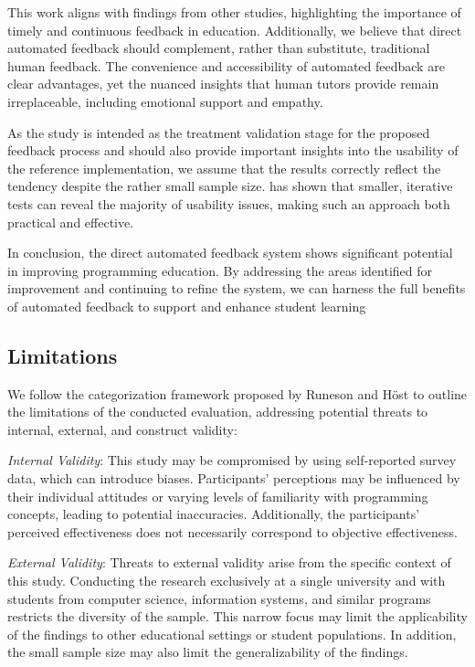 \documentclass[manuscript,screen,review, anonymous]{acmart}
\begin{document}
This work aligns with findings from other studies, highlighting the importance of timely and continuous feedback in education.
Additionally, we believe that direct automated feedback should complement, rather than substitute, traditional human feedback.
The convenience and accessibility of automated feedback are clear advantages, yet the nuanced insights that human tutors provide remain irreplaceable, including emotional support and empathy.

As the study is intended as the treatment validation stage for the proposed feedback process and should also provide important insights into the usability of the reference implementation, we assume that the results correctly reflect the tendency despite the rather small sample size. 
\citet{nielsen:2000:WhyYouOnly} has shown that smaller, iterative tests can reveal the majority of usability issues, making such an approach both practical and effective.

In conclusion, the direct automated feedback system shows significant potential in improving programming education.
By addressing the areas identified for improvement and continuing to refine the system, we can harness the full benefits of automated feedback to support and enhance student learning


\subsection{Limitations}
We follow the categorization framework proposed by Runeson and Höst \cite{runeson:2009:GuidelinesConductingReporting} to outline the limitations of the conducted evaluation, addressing potential threats to internal, external, and construct validity:

\textit{Internal Validity}: This study may be compromised by using self-reported survey data, which can introduce biases. 
Participants' perceptions may be influenced by their individual attitudes or varying levels of familiarity with programming concepts, leading to potential inaccuracies.
Additionally, the participants' perceived effectiveness does not necessarily correspond to objective effectiveness.

\textit{External Validity}: Threats to external validity arise from the specific context of this study. 
Conducting the research exclusively at a single university and with students from computer science, information systems, and similar programs restricts the diversity of the sample. 
This narrow focus may limit the applicability of the findings to other educational settings or student populations. 
In addition, the small sample size may also limit the generalizability of the findings. 
\end{document}

